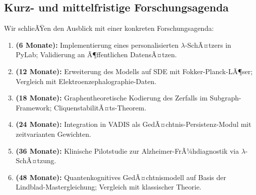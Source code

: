 ﻿\documentclass[12pt,a4paper,twoside]{article}
\theoremstyle{theormstyle}
\theoremstyle{proofstyle}
\begin{document}
	\subsection{Kurz- und mittelfristige Forschungsagenda}
	
	Wir schlieÃŸen den Ausblick mit einer konkreten Forschungsagenda:
	\begin{enumerate}[label=\textbf{F\arabic*}]
		\item \textbf{(6 Monate):} Implementierung eines personalisierten
		$\lambda$-SchÃ¤tzers in PyLab; Validierung an Ã¶ffentlichen DatensÃ¤tzen.
		\item \textbf{(12 Monate):} Erweiterung des Modells auf SDE mit
		Fokker-Planck-LÃ¶ser; Vergleich mit Elektroenzephalographie-Daten.
		\item \textbf{(18 Monate):} Graphentheoretische Kodierung des Zerfalls
		im Subgraph-Framework; CliquenstabilitÃ¤ts-Theorem.
		\item \textbf{(24 Monate):} Integration in VADIS als
		GedÃ¤chtnis-Persistenz-Modul mit zeitvarianten Gewichten.
		\item \textbf{(36 Monate):} Klinische Pilotstudie zur
		Alzheimer-FrÃ¼hdiagnostik via $\lambda$-SchÃ¤tzung.
		\item \textbf{(48 Monate):} Quantenkognitives GedÃ¤chtnismodell
		auf Basis der Lindblad-Master\-gleichung; Vergleich mit klassischer
		Theorie.
	\end{enumerate}
	
\end{document}
